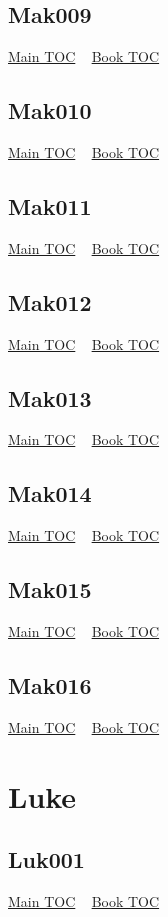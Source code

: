 \documentclass{book}
\begin{document}
  \section{Mak009}\hyperlink{toc}{Main TOC} ~ \hyperref[subsec:Mak]{Book TOC} 
  \section{Mak010}\hyperlink{toc}{Main TOC} ~ \hyperref[subsec:Mak]{Book TOC} 
  \section{Mak011}\hyperlink{toc}{Main TOC} ~ \hyperref[subsec:Mak]{Book TOC} 
  \section{Mak012}\hyperlink{toc}{Main TOC} ~ \hyperref[subsec:Mak]{Book TOC} 
  \section{Mak013}\hyperlink{toc}{Main TOC} ~ \hyperref[subsec:Mak]{Book TOC} 
  \section{Mak014}\hyperlink{toc}{Main TOC} ~ \hyperref[subsec:Mak]{Book TOC} 
  \section{Mak015}\hyperlink{toc}{Main TOC} ~ \hyperref[subsec:Mak]{Book TOC} 
  \section{Mak016}\hyperlink{toc}{Main TOC} ~ \hyperref[subsec:Mak]{Book TOC} 
  \chapter{Luke} \label{subsec:Luk} \begin{multicols}{2} \minitoc \end{multicols}
  \section{Luk001}\hyperlink{toc}{Main TOC} ~ \hyperref[subsec:Luk]{Book TOC} 
\end{document}
